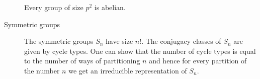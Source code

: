 \begin{description}
	\begin{proposition}
		Every group of size $p^2$ is abelian.
	\end{proposition}

	\item[Symmetric groups]
	The symmetric groups $S_n$ have size $n!$. The conjugacy classes of $S_n$ are given by cycle types. One can show that the number of cycle types is equal to the number of ways of partitioning $n$ and hence for every partition of the number $n$ we get an irreducible representation of $S_n$.
\end{description}









